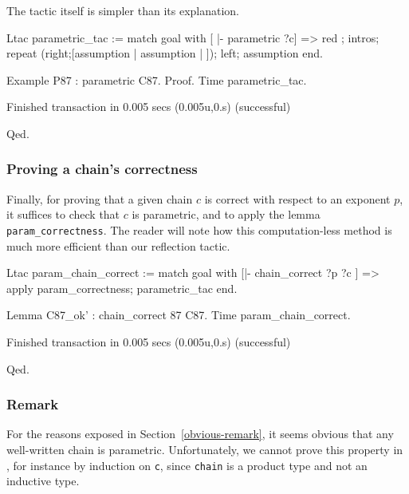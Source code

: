 The tactic itself is simpler than its explanation. 

\begin{Coqsrc}
Ltac parametric_tac  := 
match goal with [ |- parametric ?c] =>
   red ; intros;
   repeat (right;[assumption | assumption | ]);  
   left; assumption
end.

Example P87 : parametric C87.
Proof. Time parametric_tac. 
\end{Coqsrc}

\begin{Coqanswer}
Finished transaction in 0.005 secs (0.005u,0.s) (successful)
\end{Coqanswer}

\begin{Coqsrc}
Qed. 
\end{Coqsrc}



\subsubsection{Proving a chain's correctness}
\label{C87-param-ok}
Finally, for proving that a given chain $c$ is correct with respect to an exponent $p$, it suffices to check that $c$ is parametric, and
to apply the lemma \texttt{param\_correctness}. 
The reader will note how this computation-less method is much more efficient
than our reflection tactic.

\begin{Coqsrc}
Ltac param_chain_correct :=
match goal with 
[|- chain_correct ?p ?c ] => 
apply param_correctness; parametric_tac
end.

Lemma C87_ok' : chain_correct 87 C87.
Time param_chain_correct.
\end{Coqsrc}

\begin{Coqanswer}
Finished transaction in 0.005 secs (0.005u,0.s) (successful)
\end{Coqanswer}

\begin{Coqsrc}
Qed.
\end{Coqsrc}

\subsubsection{Remark}
For the reasons exposed in Section~\vref{obvious-remark}, 
it seems obvious that any well-written chain is parametric.
Unfortunately, we cannot prove this property  in \coq{},
for instance by induction on \texttt{c}, 
since \texttt{chain} is a product type and not an inductive type.

